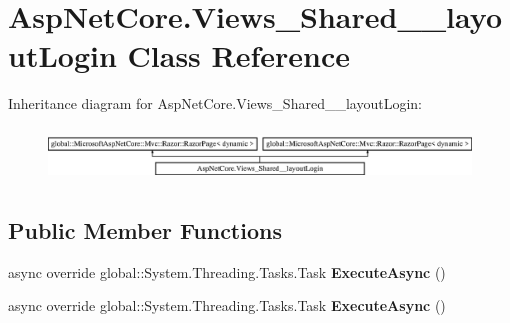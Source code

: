 \hypertarget{class_asp_net_core_1_1_views___shared____layout_login}{}\section{Asp\+Net\+Core.\+Views\+\_\+\+Shared\+\_\+\+\_\+layout\+Login Class Reference}
\label{class_asp_net_core_1_1_views___shared____layout_login}
Inheritance diagram for Asp\+Net\+Core.\+Views\+\_\+\+Shared\+\_\+\+\_\+layout\+Login\+:\begin{figure}[H]
\begin{center}
\leavevmode
\includegraphics[height=1.432225cm]{class_asp_net_core_1_1_views___shared____layout_login}
\end{center}
\end{figure}
\subsection*{Public Member Functions}
\begin{DoxyCompactItemize}
\item 
\mbox{\label{class_asp_net_core_1_1_views___shared____layout_login_a241631cf94665c0191800046366d3a27}} 
async override global\+::\+System.\+Threading.\+Tasks.\+Task {\bfseries Execute\+Async} ()
\item 
\mbox{\label{class_asp_net_core_1_1_views___shared____layout_login_a241631cf94665c0191800046366d3a27}} 
async override global\+::\+System.\+Threading.\+Tasks.\+Task {\bfseries Execute\+Async} ()
\end{DoxyCompactItemize}
